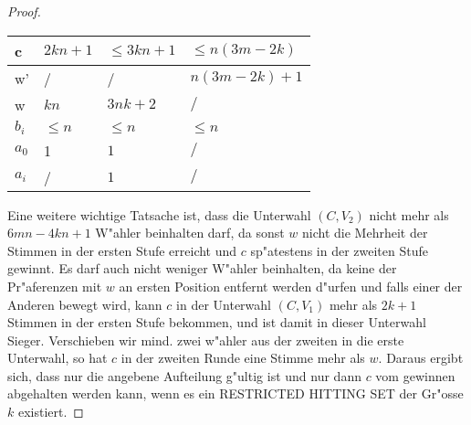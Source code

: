 \documentclass[11pt, a4paper, twoside]{article}
\begin{document}
\begin{proof}
\begin{minipage}{\textwidth}{}
\begin{tabular}{|llll|}
\hline
c&$2kn+1$& $\leq 3kn+1$& $\leq n(3m-2k)$\\
\hline
w'&/&/& $n(3m-2k)+1$\\
\hline
w&$kn$&$3nk+2$& $/$\\
\hline
$b_i$&$\leq n$&$\leq n$& $\leq n$\\
\hline
$a_0$&1& $1$& $/$\\
\hline
$a_i$&/& $1$& $/$\\
\hline
\end{tabular}
\end{minipage}
\newline
\newline
Eine weitere wichtige Tatsache ist, dass die Unterwahl $(C,V_2)$ nicht mehr als $6mn-4kn+1$ W"ahler beinhalten darf, da sonst $w$ nicht die Mehrheit der Stimmen in der ersten Stufe erreicht und $c$ sp"atestens in der zweiten Stufe gewinnt. Es darf auch nicht weniger W"ahler beinhalten, da keine der Pr"aferenzen mit $w$ an ersten Position entfernt werden d"urfen und falls einer der Anderen bewegt wird, kann $c$ in der Unterwahl $(C,V_1)$ mehr als $2k+1$ Stimmen in der ersten Stufe bekommen, und ist damit in dieser Unterwahl Sieger. Verschieben wir mind. zwei w"ahler aus der zweiten in die erste Unterwahl, so hat $c$ in der zweiten Runde eine Stimme mehr als $w$. Daraus ergibt sich, dass nur die angebene Aufteilung g"ultig ist und nur dann $c$ vom gewinnen abgehalten werden kann, wenn es ein RESTRICTED HITTING SET der Gr"osse $k$ existiert.   
\end{proof}
\end{document}
